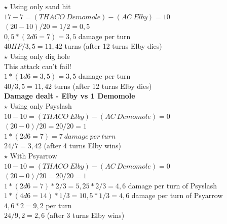 \newline
$\star$ Using only sand hit\\
$17-7 = (THACO\:Demomole) - (AC\:Elby) = 10$\\
$(20-10)/20 = 1/2 = 0,5$\\
$0,5 * (2d6 = 7) = 3,5$ damage per turn\\
$40 HP / 3,5 = 11,42$ turns (after 12 turns Elby dies)\\
\newline
$\star$ Using only dig hole \\
This attack can’t fail!\\
$1*(1d6 = 3,5) = 3,5$ damage per turn\\
$40 / 3,5 = 11,42$ turns (after 12 turns Elby dies)\\

\textbf{Damage dealt - Elby vs 1 Demomole}\\
\newline
$\star$ Using only Psyslash\\
$10-10 = (THACO\:Elby) - (AC\:Demomole) = 0$\\
$(20-0)/20 = 20/20 = 1$\\
$1 * (2d6 = 7) = 7\:damage\:per\:turn$\\
$24 / 7 = 3,42$ (after 4 turns Elby wins)\\
\newline
$\star$ With Psyarrow\\
$10-10 = (THACO\:Elby) - (AC\:Demomole) = 0$\\
$(20-0)/20 = 20/20 = 1$\\
$1 * (2d6 = 7) * 2/3  = 5,25 * 2/3 = 4,6$ damage per turn of Psyslash\\
$1 * (4d6 = 14) * 1/3 = 10,5 * 1/3 = 4,6$ damage per turn of Psyarrow\\
$4,6 * 2 = 9,2$ per turn\\
$24 / 9,2 = 2,6$ (after 3 turns Elby wins)\\
\newpage


